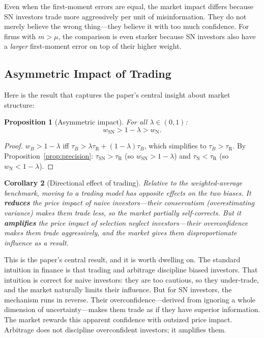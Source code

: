 \documentclass[12pt]{article}
\theoremstyle{plain}
\newtheorem{proposition}{Proposition}
\newtheorem{corollary}[proposition]{Corollary}
\theoremstyle{definition}
\newcommand{\R}{\mathrm{R}}
\newcommand{\SN}{\mathrm{SN}}
\newcommand{\N}{\mathrm{N}}
\begin{document}
Even when the first-moment errors are equal, the market impact differs because SN investors trade more aggressively per unit of misinformation. They do not merely believe the wrong thing---they believe it with too much confidence. For firms with $m > \mu$, the comparison is even starker because SN investors also have a \emph{larger} first-moment error on top of their higher weight.


\subsection{Asymmetric Impact of Trading}

Here is the result that captures the paper's central insight about market structure:

\begin{proposition}[Asymmetric impact]
\label{prop:asymmetric}
For all $\lambda \in (0,1)$:
\begin{equation}
w_\SN > 1 - \lambda > w_\N.
\label{eq:asymmetric}
\end{equation}
\end{proposition}

\begin{proof}
$w_B > 1-\lambda$ iff $\tau_B > \lambda\tau_\R + (1-\lambda)\tau_B$, which simplifies to $\tau_B > \tau_\R$. By Proposition~\ref{prop:precision}: $\tau_\SN > \tau_\R$ (so $w_\SN > 1-\lambda$) and $\tau_\N < \tau_\R$ (so $w_\N < 1-\lambda$).
\end{proof}

\begin{corollary}[Directional effect of trading]
\label{cor:direction}
Relative to the weighted-average benchmark, moving to a trading model has opposite effects on the two biases. It \textbf{reduces} the price impact of naive investors---their conservatism (overestimating variance) makes them trade less, so the market partially self-corrects. But it \textbf{amplifies} the price impact of selection neglect investors---their overconfidence makes them trade aggressively, and the market gives them disproportionate influence as a result.
\end{corollary}

This is the paper's central result, and it is worth dwelling on. The standard intuition in finance is that trading and arbitrage discipline biased investors. That intuition is correct for naive investors: they are too cautious, so they under-trade, and the market naturally limits their influence. But for SN investors, the mechanism runs in reverse. Their overconfidence---derived from ignoring a whole dimension of uncertainty---makes them trade as if they have superior information. The market rewards this apparent confidence with outsized price impact. Arbitrage does not discipline overconfident investors; it amplifies them.
\end{document}
